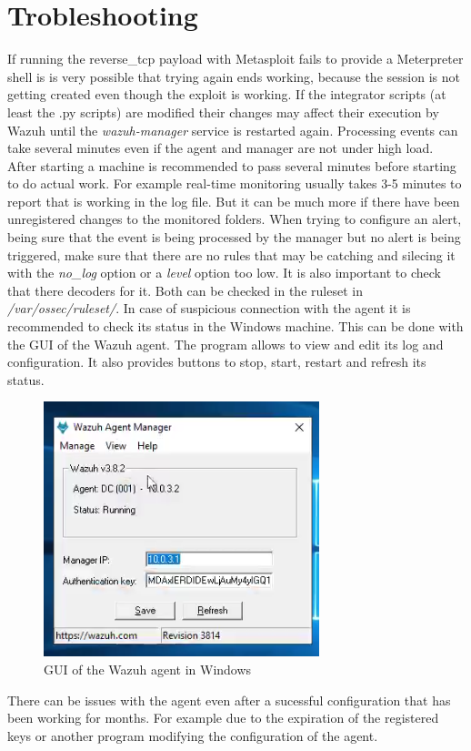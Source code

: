 \section*{Trobleshooting}
If running the reverse\_tcp payload with Metasploit fails to provide a Meterpreter shell is is very possible that trying again ends working, because the session is not getting created even though the exploit is working.
\linej
\linej
If the integrator scripts (at least the .py scripts) are modified their changes may affect their execution by Wazuh until the \textit{wazuh-manager} service is restarted again.
\linej
\linej
Processing events can take several minutes even if the agent and manager are not under high load.
After starting a machine is recommended to pass several minutes before starting to do actual work.
\linej
For example real-time monitoring usually takes 3-5 minutes to report that is working in the log file.
But it can be much more if there have been unregistered changes to the monitored folders.
\linej
\linej
When trying to configure an alert, being sure that the event is being processed by the manager but no alert is being triggered, make sure that there are no rules that may be catching and silecing it with the \textit{no\_log} option or a \textit{level} option too low.
It is also important to check that there decoders for it.
Both can be checked in the ruleset in \textit{/var/ossec/ruleset/}.
\linej
\linej
In case of suspicious connection with the agent it is recommended to check its status in the Windows machine.
This can be done with the GUI of the Wazuh agent.
The program allows to view and edit its log and configuration.
It also provides buttons to stop, start, restart and refresh its status.
\begin{figure}[H]
  \centering
	\includegraphics[width=.5\textwidth]{figuras/wazuh_agent_gui.png}
	\caption{GUI of the Wazuh agent in Windows}
\end{figure}
\linej
There can be issues with the agent even after a sucessful configuration that has been working for months.
For example due to the expiration of the registered keys or another program modifying the configuration of the agent.
